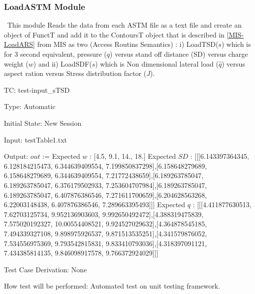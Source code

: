 \documentclass[12pt]{article}
\newcounter{utestnum} %
\begin{document}
\subsubsection{LoadASTM Module}	
	
~\newline This module Reads the data from each ASTM file as a text file and create an object of FunctT and add it to the ContoursT object that is described in \ref{MIS-LoadARS} from MIS as two (Access Routins Semantics) : i) LoadTSD($s$) which is for 3 second equivalent, 
pressure ($q$) versus stand off distance (SD) versus charge weight ($w$) and ii) LoadSDF($s$) which is Non dimensional lateral load ($\hat q$) versus aspect ration versus Stress
distribution factor ($J$). 

\noindent \newline TC\theutestnum: \label{TC_TSD}
test-input\_sTSD

Type: Automatic

Initial State: New Session

Input: testTable1.txt

Output: $out$ := 
\noindent \newline Expected $w$ : [4.5, 9.1, 14., 18.] \newline
\noindent \newline Expected $SD$ : [[[6.143397364345, 6.128184215473, 6.344639409554, 7.199850837298],[6.158648279689, 6.158648279689, 6.344639409554, 7.21772438659],[6.189263785047, 6.189263785047, 6.376179502933, 7.253604707984],[6.189263785047, 6.189263785047, 6.407876386546, 7.271611700659],[6.204628563268, 6.22003148438, 6.407876386546, 7.289663395493]]] \newline
\noindent \newline Expected $q$ : [[[4.411877630513, 7.62703125734, 9.952136903603, 9.992650492472],[4.388319475839, 7.575020192327, 10.00554408521, 9.924527029632],[4.364878545185, 7.494339327108, 9.898975926537, 9.871513535251],[4.341579876052, 7.534556975369, 9.793542815831, 9.833410793036],[4.318397091121, 7.434385814135, 9.846098917578, 9.766372924029]]] \newline


\noindent \newline Test Case Derivation: None 

\noindent \newline How test will be performed: Automated test on unit testing framework.
\end{document}
